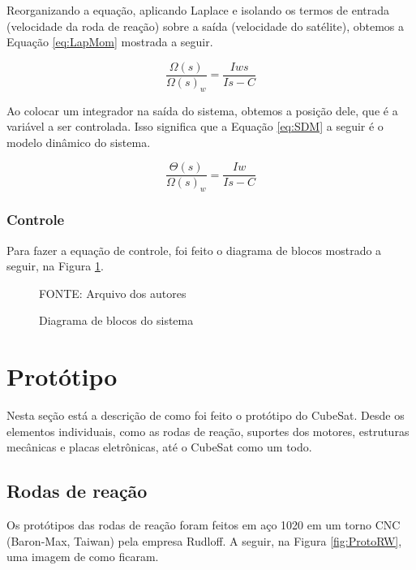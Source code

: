 \documentclass[
	12pt,				%
	openany,			%
	twoside,			%
	a4paper,			%
	english,			%
	french,				%
	spanish,			%
	brazil,				%
	oldfontcommands
	]{abntex2}
\begin{document}
Reorganizando a equação, aplicando Laplace e isolando os termos de entrada (velocidade da roda de reação) sobre a saída (velocidade do satélite), obtemos a Equação \ref{eq:LapMom} mostrada a seguir.

\begin{equation}
\frac{\Omega(s)}{\Omega(s)_{w}} = \frac{Iws}{Is - C}
\label{eq:LapMom}
\end{equation}

Ao colocar um integrador na saída do sistema, obtemos a posição dele, que é a variável a ser controlada. Isso significa que a Equação \ref{eq:SDM} a seguir é o modelo dinâmico do sistema.

\begin{equation}
\frac{\Theta(s)}{\Omega(s)_{w}} = \frac{Iw}{Is - C}
\label{eq:SDM}
\end{equation}

\subsection{Controle}

Para fazer a equação de controle, foi feito o diagrama de blocos mostrado a seguir, na Figura \ref{fig:Diagram}.

\begin{figure}[th]
	\caption{Diagrama de blocos do sistema}
	\centering
	
	\begin{small}
		FONTE: Arquivo dos autores
	\end{small}
	\label{fig:Diagram}
\end{figure}

\chapter[Protótipo]{Protótipo}

Nesta seção está a descrição de como foi feito o protótipo do CubeSat. Desde os elementos individuais, como as rodas de reação, suportes dos motores, estruturas mecânicas e placas eletrônicas, até o CubeSat como um todo.

\section{Rodas de reação}

Os protótipos das rodas de reação foram feitos em aço 1020 em um torno CNC (Baron-Max, Taiwan) pela empresa Rudloff. A seguir, na Figura \ref{fig:ProtoRW}, uma imagem de como ficaram.
\end{document}
